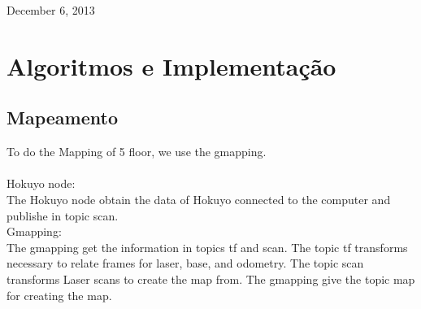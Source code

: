 \documentclass[journal]{IEEEtran}
\begin{document}



\hfill December 6, 2013

\section{Algoritmos e Implementação}

\subsection{Mapeamento}
%

	To do the Mapping of 5 floor, we use the gmapping.
	\\
	\\
	Hokuyo node:
	\\
	The Hokuyo node obtain the data of Hokuyo connected to the computer and
	publishe in topic scan.
	\\

	Gmapping:
	\\
	The gmapping get the information in topics tf and scan. The topic tf transforms necessary to relate frames for laser, base, and odometry. The topic scan transforms Laser scans to create the map from.
	The gmapping give the topic map for creating the map.
	\\
\end{document}
